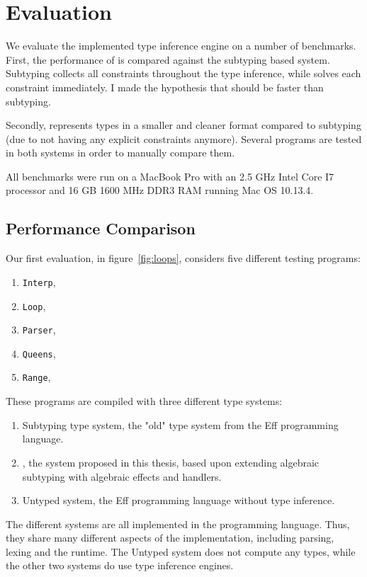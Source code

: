 \section{Evaluation}\label{eval}
We evaluate the implemented type inference engine on a number of benchmarks. First, the performance of \core is compared against the subtyping based system. Subtyping collects all constraints throughout the type inference, while \core solves each constraint immediately. I made the hypothesis that \core should be faster than subtyping. 

Secondly, \core represents types in a smaller and cleaner format compared to subtyping (due to not having any explicit constraints anymore). Several programs are tested in both systems in order to manually compare them. 

All benchmarks were run on a MacBook Pro with an 2.5 GHz Intel Core I7 processor and 16 GB 1600 MHz DDR3 RAM running Mac OS 10.13.4.

\subsection{Performance Comparison}

Our first evaluation, in figure~\ref{fig:loops}, considers five different testing programs:
\begin{enumerate}
\item \texttt{Interp}, 
\item \texttt{Loop}, 
\item \texttt{Parser}, 
\item \texttt{Queens}, 
\item \texttt{Range},
\end{enumerate}

These programs are compiled with three different type systems:
\begin{enumerate}
\item Subtyping type system, the "old" type system from the Eff programming language. 
\item \core, the system proposed in this thesis, based upon extending algebraic subtyping with algebraic effects and handlers.
\item Untyped system, the Eff programming language without type inference.
\end{enumerate}

The different systems are all implemented in the \eff programming language. Thus, they share many different aspects of the implementation, including parsing, lexing and the runtime. The Untyped system does not compute any types, while the other two systems do use type inference engines. 

